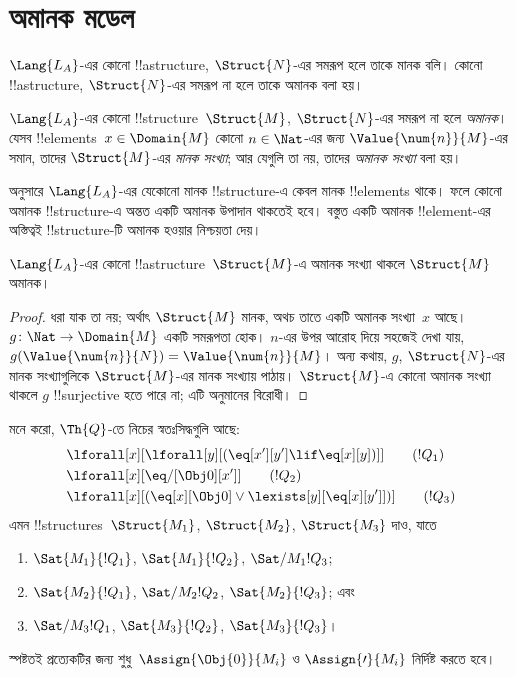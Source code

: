 \documentclass[../../../include/open-logic-section]{subfiles}
\begin{document}
\section{অমানক মডেল}

\begin{explain}
$\Lang{L_A}$-এর কোনো !!a{structure}, $\Struct{N}$-এর সমরূপ হলে তাকে
মানক বলি। কোনো !!a{structure}, $\Struct{N}$-এর সমরূপ না হলে তাকে
অমানক বলা হয়।
\end{explain}

\begin{defn}
$\Lang{L_A}$-এর কোনো !!{structure}~$\Struct{M}$, $\Struct{N}$-এর
সমরূপ না হলে \emph{অমানক}। যেসব !!{element}s~$x \in \Domain{M}$ কোনো
$n \in \Nat$-এর জন্য $\Value{\num{n}}{M}$-এর সমান, তাদের
$\Struct{M}$-এর \emph{মানক সংখ্যা}; আর যেগুলি তা নয়, তাদের
\emph{অমানক সংখ্যা} বলা হয়।
\end{defn}

\begin{explain}
 অনুসারে $\Lang{L_A}$-এর যেকোনো মানক
!!{structure}-এ কেবল মানক !!{element}s থাকে। ফলে কোনো অমানক
!!{structure}-এ অন্তত একটি অমানক উপাদান থাকতেই হবে। বস্তুত একটি অমানক
!!{element}-এর অস্তিত্বই !!{structure}-টি অমানক হওয়ার নিশ্চয়তা দেয়।
\end{explain}

\begin{prop}
$\Lang{L_A}$-এর কোনো !!a{structure}~$\Struct{M}$-এ অমানক সংখ্যা
থাকলে $\Struct{M}$ অমানক।
\end{prop}

\begin{proof}
ধরা যাক তা নয়; অর্থাৎ $\Struct{M}$ মানক, অথচ তাতে একটি অমানক
সংখ্যা~$x$ আছে। $g\colon \Nat \to \Domain{M}$ একটি সমরূপতা হোক।
$n$-এর উপর আরোহ দিয়ে সহজেই দেখা যায়,
$g(\Value{\num{n}}{N})=\Value{\num{n}}{M}$। অন্য কথায়, $g$,
$\Struct{N}$-এর মানক সংখ্যাগুলিকে $\Struct{M}$-এর মানক সংখ্যায় পাঠায়।
$\Struct{M}$-এ কোনো অমানক সংখ্যা থাকলে $g$ !!{surjective} হতে পারে না;
এটি অনুমানের বিরোধী।
\end{proof}

\begin{prob}
মনে করো, $\Th{Q}$-তে নিচের স্বতঃসিদ্ধগুলি আছে:
\begin{align*}
& \lforall[x][\lforall[y][(\eq[x'][y'] \lif \eq[x][y])]] \tag{$!Q_1$}\\
& \lforall[x][\eq/[\Obj 0][x']] \tag{$!Q_2$}\\
& \lforall[x][(\eq[x][\Obj 0] \lor \lexists[y][\eq[x][y']])] \tag{$!Q_3$}
\end{align*}
এমন !!{structure}s~$\Struct{M_1}$, $\Struct{M_2}$, $\Struct{M_3}$ দাও,
যাতে
\begin{enumerate}
\item $\Sat{M_1}{!Q_1}$, $\Sat{M_1}{!Q_2}$, $\Sat/{M_1}{!Q_3}$;
\item $\Sat{M_2}{!Q_1}$, $\Sat/{M_2}{!Q_2}$, $\Sat{M_2}{!Q_3}$; এবং
\item $\Sat/{M_3}{!Q_1}$, $\Sat{M_3}{!Q_2}$, $\Sat{M_3}{!Q_3}$।
\end{enumerate}
স্পষ্টতই প্রত্যেকটির জন্য শুধু~$\Assign{\Obj{0}}{M_i}$ ও
$\Assign{\prime}{M_i}$ নির্দিষ্ট করতে হবে।
\end{prob}
\end{document}
